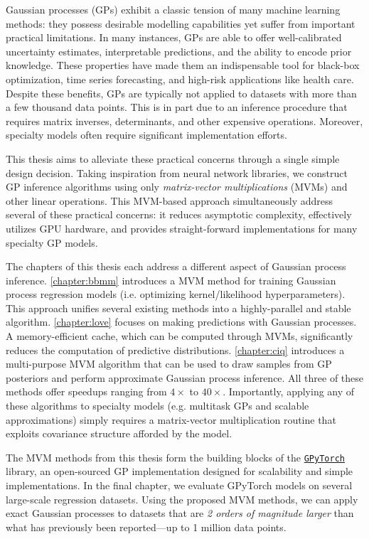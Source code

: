 Gaussian processes (GPs) exhibit a classic tension of many machine learning methods:
they possess desirable modelling capabilities yet suffer from important practical limitations.
In many instances, GPs are able to offer well-calibrated uncertainty estimates, interpretable predictions, and the ability to encode prior knowledge.
These properties have made them an indispensable tool for black-box optimization, time series forecasting, and high-risk applications like health care.
Despite these benefits, GPs are typically not applied to datasets with more than a few thousand data points.
This is in part due to an inference procedure that requires matrix inverses, determinants, and other expensive operations.
Moreover, specialty models often require significant implementation efforts.

This thesis aims to alleviate these practical concerns through a single simple design decision.
Taking inspiration from neural network libraries, we construct GP inference algorithms using only \emph{matrix-vector multiplications} (MVMs) and other linear operations.
This MVM-based approach simultaneously address several of these practical concerns: it reduces asymptotic complexity, effectively utilizes GPU hardware, and provides straight-forward implementations for many specialty GP models.

The chapters of this thesis each address a different aspect of Gaussian process inference.
\cref{chapter:bbmm} introduces a MVM method for training Gaussian process regression models (i.e. optimizing kernel/likelihood hyperparameters).
This approach unifies several existing methods into a highly-parallel and stable algorithm.
\cref{chapter:love} focuses on making predictions with Gaussian processes.
A memory-efficient cache, which can be computed through MVMs, significantly reduces the computation of predictive distributions.
\cref{chapter:ciq} introduces a multi-purpose MVM algorithm that can be used to draw samples from GP posteriors and perform approximate Gaussian process inference.
All three of these methods offer speedups ranging from $4\times$ to $40\times$.
Importantly, applying any of these algorithms to specialty models (e.g. multitask GPs and scalable approximations) simply requires a matrix-vector multiplication routine that exploits covariance structure afforded by the model.

The MVM methods from this thesis form the building blocks of the \href{http://github.com/cornellius-gp/gpytorch}{\tt GPyTorch} library, an open-sourced GP implementation designed for scalability and simple implementations.
In the final chapter, we evaluate GPyTorch models on several large-scale regression datasets.
Using the proposed MVM methods, we can apply exact Gaussian processes to datasets that are \emph{2 orders of magnitude larger} than what has previously been reported---up to 1 million data points.
